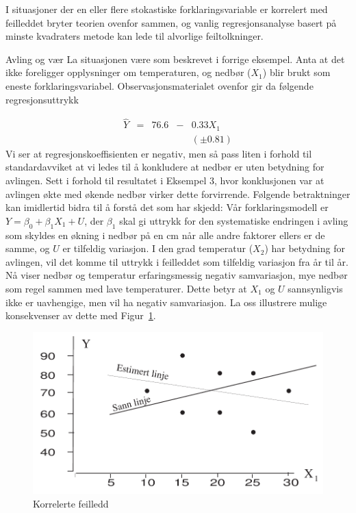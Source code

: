 I situasjoner der en eller flere stokastiske forklaringsvariable er 
korrelert med feilleddet bryter teorien ovenfor sammen, og vanlig 
regresjonsanalyse basert på minste kvadraters metode kan lede til
alvorlige feiltolkninger.\\


\begin{eksempel}{Avling og vær}
La situasjonen være som beskrevet i forrige eksempel.  Anta at det
ikke foreligger opplysninger om temperaturen, og nedbør ($X_1$) blir 
brukt som eneste forklaringsvariabel.  Observasjonsmaterialet ovenfor gir
da følgende regresjonsuttrykk

\[  \begin{array}{ccccc}
        \hat{Y}&=&76.6&-&0.33X_1       \\
               & &    & &(\pm 0.81)
 \end{array} \]
Vi ser at regresjonskoeffisienten er negativ, men så pass liten i
forhold til standardavviket at vi ledes til å konkludere at nedbør
er uten betydning for avlingen.  Sett i forhold til resultatet i Eksempel
3, hvor konklusjonen var at avlingen økte med økende nedbør virker
dette forvirrende.  Følgende betraktninger kan imidlertid bidra til å
forstå det som har skjedd:  Vår forklaringsmodell er $ Y={\beta}_0 +
{\beta}_1X_1 + U $, der ${\beta}_1 $ skal gi uttrykk for den systematiske
endringen i avling som skyldes en økning i nedbør på en cm når
alle andre faktorer ellers er de samme, og $U$ er tilfeldig variasjon.  I den
grad temperatur ($X_2$) har betydning for avlingen, vil det komme til uttrykk
i feilleddet som tilfeldig variasjon fra år til år.  Nå viser
nedbør og temperatur erfaringsmessig negativ samvariasjon, mye nedbør
som regel sammen med lave temperaturer.  Dette betyr at $X_1$ og $U$
sannsynligvis ikke er uavhengige, men vil ha negativ samvariasjon.  La oss
illustrere mulige konsekvenser av dette med Figur~\ref{fig:korrelerte}.
\end{eksempel}

\begin{figure}[ht]
\centering
  \includegraphics[scale=0.7]{figurer/fig12_2.pdf}
 \caption{Korrelerte feilledd}
	\label{fig:korrelerte}
\end{figure}

